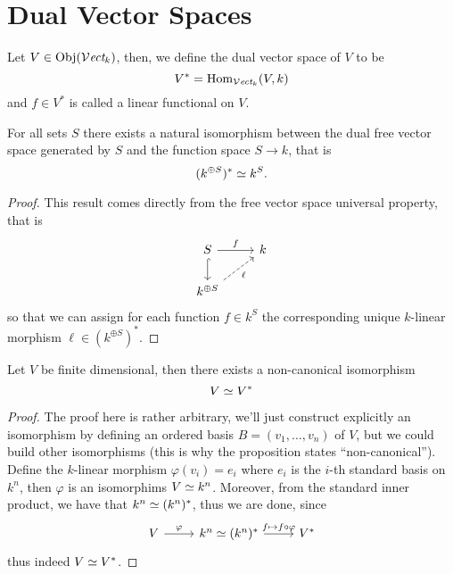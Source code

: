 \section{Dual Vector Spaces}

\begin{definition}
  Let \(V \in \operatorname{Obj}({\mathcal{V}\textit{ect}}_k)\), then, we define the dual vector space of
  \(V\) to be
  \[
    V^\ast = \operatorname{Hom}_{{\mathcal{V}\textit{ect}}_k} (V, k)
  \]
  and \(f \in V^\ast\) is called a linear functional on \(V\).
\end{definition}

\begin{proposition}
  For all sets \(S\) there exists a natural isomorphism between the dual free
  vector space generated by \(S\) and the function space \(S \to k\), that is
  \[
    (k^{\oplus S})^\ast \simeq k^S.
  \]
\end{proposition}

\begin{proof}
  This result comes directly from the free vector space universal property, that
  is
  \[
    \begin{tikzcd}
      S \ar[r, "f"] \ar[d, hook] & k \\
      k^{\oplus S} \ar[ur, dashed, swap, "\ell"]
    \end{tikzcd}
  \]
  so that we can assign for each function \(f \in k^S\) the corresponding unique
  \(k\)-linear morphism \(\ell \in (k^{\oplus S})^\ast\).
\end{proof}

\begin{proposition}\label{prop: finite dim vs iso dual vs}
  Let \(V\) be finite dimensional, then there exists a non-canonical isomorphism
  \[
    V \simeq V^\ast
  \]
\end{proposition}

\begin{proof}
  The proof here is rather arbitrary, we'll just construct explicitly an
  isomorphism by defining an ordered basis \(B = (v_1, \dots, v_n)\) of \(V\),
  but we could build other isomorphisms (this is why the proposition states
  ``non-canonical''). Define the \(k\)-linear morphism \(\varphi(v_i) = e_i\)
  where \(e_i\) is the \(i\)-th standard basis on \(k^n\), then \(\varphi\) is
  an isomorphims \(V \simeq k^n\). Moreover, from the standard inner product, we
  have that \(k^n \simeq (k^n)^\ast\), thus we are done, since
  \[
    \begin{tikzcd}
      V \ar[r, "\varphi"] & k^n \iso (k^n)^\ast \ar[r, "f \mapsto f \circ
      \varphi"] &V^\ast
    \end{tikzcd}
  \]
  thus indeed \(V \simeq V^\ast\).
\end{proof}

